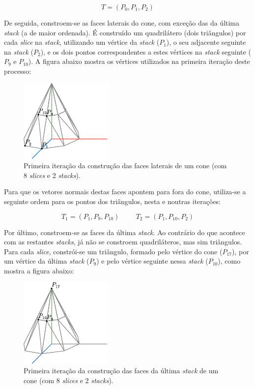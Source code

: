 \documentclass[12pt, a4paper]{article}
\begin{document}
$$
T = (P_0, P_1, P_2)
$$

De seguida, constroem-se as faces laterais do cone, com exceção das da última \emph{stack} (a de
maior ordenada). É construído um quadrilátero (dois triângulos) por cada \emph{slice} na
\emph{stack}, utilizando um vértice da \emph{stack} ($P_1$), o seu adjacente seguinte na
\emph{stack} ($P_2$), e os dois pontos correspondentes a estes vértices na \emph{stack} seguinte
($P_9$ e $P_{10}$). A figura abaixo mostra os vértices utilizados na primeira iteração deste
processo:

\begin{figure}[H]
    \centering
    \includegraphics[width=0.4\textwidth]{res/figures/Cone4.pdf}
    \caption{
        \onehalfspacing
        Primeira iteração da construção das faces laterais de um cone (com 8 \emph{slices} e 2
        \emph{stacks}).
    }
\end{figure}

Para que os vetores normais destas faces apontem para fora do cone, utiliza-se a seguinte ordem para
os pontos dos triângulos, nesta e noutras iterações:

$$
T_1 = (P_1, P_9, P_{10})
\hspace{1cm}
T_2 = (P_1, P_{10}, P_2)
$$

Por último, constroem-se as faces da última \emph{stack}. Ao contrário do que acontece com as
restantes \emph{stacks}, já não se constroem quadriláteros, mas sim triângulos. Para cada
\emph{slice}, constrói-se um triângulo, formado pelo vértice do cone ($P_{17}$), por um vértice da
última \emph{stack} ($P_9$) e pelo vértice seguinte nessa \emph{stack} ($P_{10}$), como mostra a
figura abaixo:

\begin{figure}[H]
    \centering
    \includegraphics[width=0.4\textwidth]{res/figures/Cone5.pdf}
    \caption{
        \onehalfspacing
        Primeira iteração da construção das faces da última \emph{stack} de um cone (com 8
        \emph{slices} e 2 \emph{stacks}).
    }
\end{figure}
\end{document}

